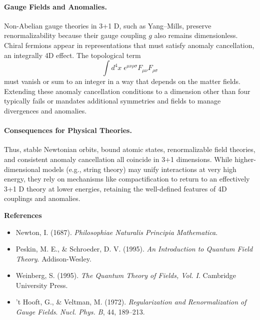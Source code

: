 \begin{technical}
\paragraph{Gauge Fields and Anomalies.}
Non-Abelian gauge theories in 3+1 D, such as Yang–Mills, preserve renormalizability because their gauge coupling $g$ also remains dimensionless. Chiral fermions appear in representations that must satisfy anomaly cancellation, an integrally 4D effect. The topological term
$$
\int d^4 x \;\epsilon^{\mu\nu\rho\sigma} F_{\mu\nu} F_{\rho\sigma}
$$
must vanish or sum to an integer in a way that depends on the matter fields. Extending these anomaly cancellation conditions to a dimension other than four typically fails or mandates additional symmetries and fields to manage divergences and anomalies.

\paragraph{Consequences for Physical Theories.}
Thus, stable Newtonian orbits, bound atomic states, renormalizable field theories, and consistent anomaly cancellation all coincide in 3+1 dimensions. While higher-dimensional models (e.g., string theory) may unify interactions at very high energy, they rely on mechanisms like compactification to return to an effectively 3+1 D theory at lower energies, retaining the well-defined features of 4D couplings and anomalies.

\vspace{0.5em}
\noindent
\textbf{References}
\begin{itemize}
\setlength\itemsep{0.25em}
\item Newton, I. (1687). \emph{Philosophiae Naturalis Principia Mathematica}.
\item Peskin, M. E., \& Schroeder, D. V. (1995). \emph{An Introduction to Quantum Field Theory}. Addison-Wesley.
\item Weinberg, S. (1995). \emph{The Quantum Theory of Fields, Vol. I}. Cambridge University Press.
\item ’t Hooft, G., \& Veltman, M. (1972). \emph{Regularization and Renormalization of Gauge Fields}. \emph{Nucl. Phys. B}, 44, 189–213.
\end{itemize}

\end{technical}
